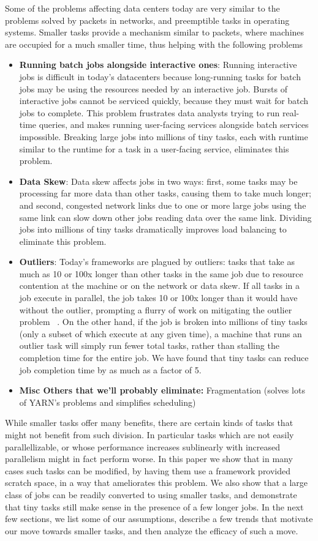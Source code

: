 Some of the problems affecting data centers today are very similar to the problems solved by packets in networks, and
preemptible tasks in operating systems. Smaller tasks provide a mechanism similar to packets, where machines are
occupied for a much smaller time, thus helping with the following problems
\begin{itemize}
\item \textbf{Running batch jobs alongside interactive ones}: Running interactive
jobs is difficult in today's datacenters because long-running tasks for batch jobs may be
using the resources needed by an interactive job. Bursts of interactive jobs
cannot be serviced quickly, because they must wait for batch jobs to complete.
This problem frustrates data analysts trying to run real-time queries, and makes
running user-facing services alongside batch services impossible. Breaking large
jobs into millions of tiny tasks, each with runtime similar to the runtime for a
task in a user-facing service, eliminates this problem.
\item \textbf{Data Skew}: Data skew affects jobs in two ways: first, some tasks
may be processing far more data than other tasks, causing them to take much
longer; and second, congested network links due to one or more large jobs using
the same link can slow down other jobs reading data over the same link. Dividing
jobs into millions of tiny tasks dramatically improves load balancing to eliminate
this problem.
\item \textbf{Outliers}: Today's frameworks are plagued by outliers: tasks that
take as much as 10 or 100x longer than other tasks in the same job due to
resource contention at the machine or on the network or data skew.  If all tasks in a job execute in parallel, the job takes 10 or 100x longer than it would
have without the outlier, prompting a flurry of work on mitigating the outlier
problem ~\cite{blah,blah,blah}. On the other hand, if the job is broken into millions of tiny tasks (only a subset of which execute at any given time), a machine
that runs an outlier task will simply run fewer total tasks, rather than
stalling the completion time for the entire job. We have found that tiny tasks can reduce job
completion time by as much as a factor of 5.
\item \textbf{Misc Others that we'll probably eliminate:} Fragmentation (solves
lots of YARN's problems and simplifies scheduling)
\end{itemize}

While smaller tasks offer many benefits, there are certain kinds of tasks that might not benefit from such division. In
particular tasks which are not easily parallellizable, or whose performance increases sublinearly with increased
parallelism might in fact perform worse. In this paper we show that in many cases such tasks can be modified, by having
them use a framework provided scratch space, in a way that ameliorates this problem. We also show that a large class of
jobs can be readily converted to using smaller tasks, and demonstrate that tiny tasks still make sense in the presence
of a few longer jobs. In the next few sections, we list some of our assumptions, describe a few trends that motivate our
move towards smaller tasks, and then analyze the efficacy of such a move.
